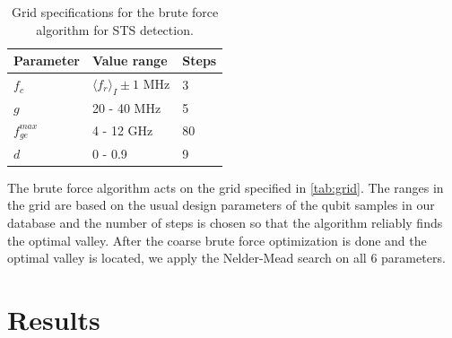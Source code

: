\documentclass[%
 aip,
 draft,
 amsmath,amssymb,
 reprint,%
]{revtex4-1}
\begin{document}
\begin{table}
	\centering
	\begin{ruledtabular}
		\begin{tabular}{lll} 
			Parameter & Value range & Steps \\ 
			\hline
			$f_c$ & $\langle f_r \rangle_{I} \pm 1$ MHz & 3\\ 
			$g$ & 20 - 40 MHz & 5\\
			$f_{ge}^{max}$ &  4 - 12 GHz & 80 \\
			$d$& 0 - 0.9 & 9
		\end{tabular} 
	\end{ruledtabular}
	\caption{Grid specifications for the brute force algorithm for STS detection.}
	\label{tab:grid}
\end{table}

The brute force algorithm acts on the grid specified in \autoref{tab:grid}. The ranges in the grid are based on the usual design parameters of the qubit samples in our database and the number of steps is chosen so that the algorithm reliably finds the optimal valley. After the coarse brute force optimization is done and the optimal valley is located, we apply the Nelder-Mead search on all 6 parameters.


\section{Results}
\end{document}

